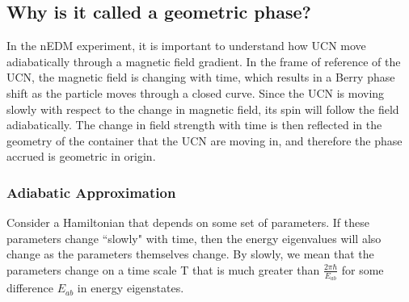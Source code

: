 \subsection{Why is it called a geometric phase?}

In the nEDM experiment, it is important to understand how UCN move
adiabatically through a magnetic field gradient.  In the frame of
reference of the UCN, the magnetic field is changing with time, which
results in a Berry phase shift as the particle moves through a closed
curve.  Since the UCN is moving slowly with respect to the change in
magnetic field, its spin will follow the field adiabatically.  The
change in field strength with time is then reflected in the geometry
of the container that the UCN are moving in, and therefore the phase
accrued is geometric in origin.
 

\subsubsection{Adiabatic Approximation}
Consider a Hamiltonian that depends on some set of parameters. If
these parameters change ``slowly" with time, then the energy
eigenvalues will also change as the parameters themselves change. By
slowly, we mean that the parameters change on a time scale T that is
much greater than $\frac{2\pi \hbar}{E_{ab}}$ for some difference
$E_{ab}$ in energy eigenstates.

